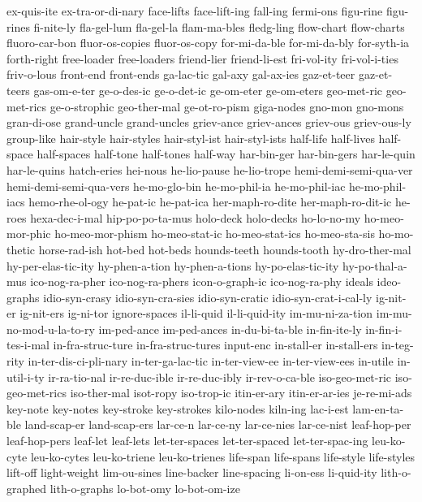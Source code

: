 {ex-quis-ite
ex-tra-or-di-nary
face-lifts
face-lift-ing
fall-ing
fermi-ons
figu-rine
figu-rines
fi-nite-ly
fla-gel-lum
fla-gel-la
flam-ma-bles
fledg-ling
flow-chart
flow-charts
fluoro-car-bon
fluor-os-copies
fluor-os-copy
for-mi-da-ble
for-mi-da-bly
for-syth-ia
forth-right
free-loader
free-loaders
friend-lier
friend-li-est
fri-vol-ity
fri-vol-i-ties
friv-o-lous
front-end
front-ends
ga-lac-tic
gal-axy
gal-ax-ies
gaz-et-teer
gaz-et-teers
gas-om-e-ter
ge-o-des-ic
ge-o-det-ic
ge-om-eter
ge-om-eters
geo-met-ric
geo-met-rics
ge-o-strophic
geo-ther-mal
ge-ot-ro-pism
giga-nodes
gno-mon
gno-mons
gran-di-ose
grand-uncle
grand-uncles
griev-ance
griev-ances
griev-ous
griev-ous-ly
group-like
hair-style
hair-styles
hair-styl-ist
hair-styl-ists
half-life
half-lives
half-space
half-spaces
half-tone
half-tones
half-way
har-bin-ger
har-bin-gers
har-le-quin
har-le-quins
hatch-eries
hei-nous
he-lio-pause
he-lio-trope
hemi-demi-semi-qua-ver
hemi-demi-semi-qua-vers
he-mo-glo-bin
he-mo-phil-ia
he-mo-phil-iac
he-mo-phil-iacs
hemo-rhe-ol-ogy
he-pat-ic
he-pat-ica
her-maph-ro-dite
her-maph-ro-dit-ic
he-roes
hexa-dec-i-mal
hip-po-po-ta-mus
holo-deck
holo-decks
ho-lo-no-my
ho-meo-mor-phic
ho-meo-mor-phism
ho-meo-stat-ic
ho-meo-stat-ics
ho-meo-sta-sis
ho-mo-thetic
horse-rad-ish
hot-bed
hot-beds
hounds-teeth
hounds-tooth
hy-dro-ther-mal
hy-per-elas-tic-ity
hy-phen-a-tion
hy-phen-a-tions
hy-po-elas-tic-ity
hy-po-thal-a-mus
ico-nog-ra-pher
ico-nog-ra-phers
icon-o-graph-ic
ico-nog-ra-phy
ideals
ideo-graphs
idio-syn-crasy
idio-syn-cra-sies
idio-syn-cratic
idio-syn-crat-i-cal-ly
ig-nit-er
ig-nit-ers
ig-ni-tor
ignore-spaces
il-li-quid
il-li-quid-ity
im-mu-ni-za-tion
im-mu-no-mod-u-la-to-ry
im-ped-ance
im-ped-ances
in-du-bi-ta-ble
in-fin-ite-ly
in-fin-i-tes-i-mal
in-fra-struc-ture
in-fra-struc-tures
input-enc
in-stall-er
in-stall-ers
in-teg-rity
in-ter-dis-ci-pli-nary
in-ter-ga-lac-tic
in-ter-view-ee
in-ter-view-ees
in-utile
in-util-i-ty
ir-ra-tio-nal
ir-re-duc-ible
ir-re-duc-ibly
ir-rev-o-ca-ble
iso-geo-met-ric
iso-geo-met-rics
iso-ther-mal
isot-ropy
iso-trop-ic
itin-er-ary
itin-er-ar-ies
je-re-mi-ads
key-note
key-notes
key-stroke
key-strokes
kilo-nodes
kiln-ing
lac-i-est
lam-en-ta-ble
land-scap-er
land-scap-ers
lar-ce-n
lar-ce-ny
lar-ce-nies
lar-ce-nist
leaf-hop-per
leaf-hop-pers
leaf-let
leaf-lets
let-ter-spaces
let-ter-spaced
let-ter-spac-ing
leu-ko-cyte
leu-ko-cytes
leu-ko-triene
leu-ko-trienes
life-span
life-spans
life-style
life-styles
lift-off
light-weight
lim-ou-sines
line-backer
line-spacing
li-on-ess
li-quid-ity
lith-o-graphed
lith-o-graphs
lo-bot-omy
lo-bot-om-ize
}
